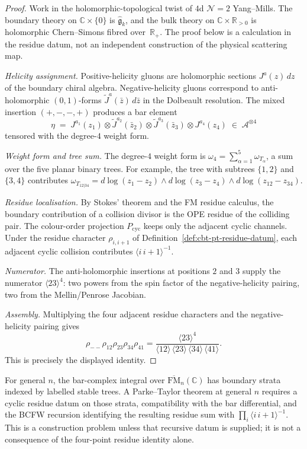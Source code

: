 \begin{proof}
Work in the holomorphic-topological twist of \(4\)d
\(\mathcal{N}=2\) Yang--Mills.  The boundary theory on
\(\mathbb{C}\times\{0\}\) is \(\widehat{\mathfrak{g}}_k\), and the
bulk theory on \(\mathbb{C}\times\mathbb{R}_{>0}\) is holomorphic
Chern--Simons fibred over~\(\mathbb{R}_+\).  The proof below is a
calculation in the residue datum, not an independent construction of
the physical scattering map.

\emph{Helicity assignment.}
Positive-helicity gluons are holomorphic sections $J^a(z)\,dz$ of the boundary chiral algebra. Negative-helicity gluons correspond to anti-holomorphic $(0,1)$-forms $\tilde J^a(\bar z)\,d\bar z$ in the Dolbeault resolution. The mixed insertion $(+,-,-,+)$ produces a bar element
\[
\eta \;=\; J^{a_1}(z_1) \otimes \tilde J^{a_2}(\bar z_2) \otimes
\tilde J^{a_3}(\bar z_3) \otimes J^{a_4}(z_4)
\;\in\; \mathcal{A}^{\otimes 4}
\]
tensored with the degree-$4$ weight form.

\emph{Weight form and tree sum.}
The degree-$4$ weight form is $\omega_4 = \sum_{\alpha=1}^{5} \omega_{T_\alpha}$, a sum over the five planar binary trees. For example, the tree with subtrees $\{1,2\}$ and $\{3,4\}$ contributes $\omega_{T_{12|34}} = d\log(z_1 - z_2) \wedge d\log(z_3 - z_4) \wedge d\log(z_{12} - z_{34})$.

\emph{Residue localisation.}
By Stokes' theorem and the FM residue calculus, the boundary
contribution of a collision divisor is the OPE residue of the
colliding pair.  The colour-order projection \(P_{\mathrm{cyc}}\)
keeps only the adjacent cyclic channels.  Under the residue character
\(\rho_{i,i+1}\) of Definition~\ref{def:cbt-pt-residue-datum}, each
adjacent cyclic collision contributes
\(\langle i\,i{+}1\rangle^{-1}\).

\emph{Numerator.}
The anti-holomorphic insertions at positions $2$ and $3$ supply the numerator $\langle 23\rangle^4$: two powers from the spin factor of the negative-helicity pairing, two from the Mellin/Penrose Jacobian.

\emph{Assembly.}
Multiplying the four adjacent residue characters and the
negative-helicity pairing gives
\[
\rho_{--}\rho_{12}\rho_{23}\rho_{34}\rho_{41}
=
\frac{\langle 23\rangle^4}
{\langle 12\rangle\,\langle 23\rangle\,
\langle 34\rangle\,\langle 41\rangle}.
\]
This is precisely the displayed identity.
\end{proof}

\begin{remark}
\label{rem:cbt-mhv-general-n}
For general \(n\), the bar-complex integral over
\(\overline{\mathrm{FM}}_n(\mathbb{C})\) has boundary strata indexed
by labelled stable trees.  A Parke--Taylor theorem at general \(n\)
requires a cyclic residue datum on those strata, compatibility with
the bar differential, and the BCFW recursion identifying the resulting
residue sum with
\(\prod_i\langle i\,i{+}1\rangle^{-1}\).  This is a construction
problem unless that recursive datum is supplied; it is not a
consequence of the four-point residue identity alone.
\end{remark}

